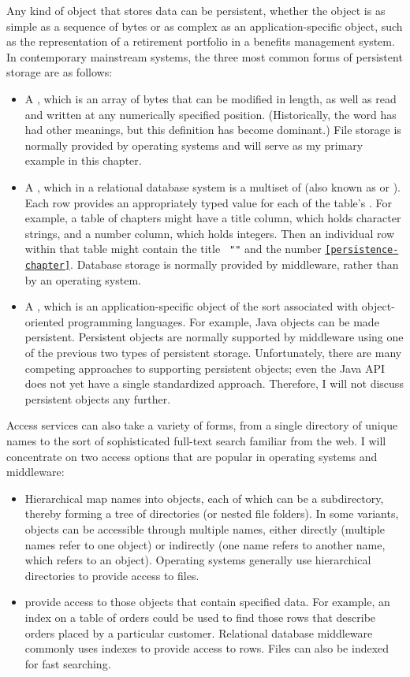 Any kind of object that stores data can be persistent,
whether the object is as simple as a
sequence of bytes or as complex as an application-specific object,
such as the representation of a retirement portfolio in a benefits
management system.  In contemporary mainstream systems, the three most
common forms of persistent storage are as follows:
\begin{itemize}
\item
A , which is an array of bytes that can be modified in length, as
well as read and written at any numerically specified position.
(Historically, the word has had other meanings, but this definition
has become dominant.)  File storage is normally provided by operating
systems and will serve as my primary example in this chapter.
\item
A , which in a relational database system is a multiset of
 (also known as  or ). Each row provides an
appropriately typed value for each of the table's .
For example, a table of chapters might have a title column, which holds
character strings, and a number column, which holds integers.  Then an
individual row within that table might contain the title {\tt
"\persistenceChapterTitle"} and the number {\tt \ref{persistence-chapter}}.
Database storage is normally provided by middleware, rather than by an
operating system.
\item
A , which is
an application-specific object of the sort associated with
object-oriented programming languages.  For example, Java objects
can be made persistent.  Persistent objects
are normally supported by middleware using one of the previous two
types of persistent storage.  Unfortunately, there are many
competing approaches to supporting persistent objects; even the Java
API does not yet have a single standardized approach.  Therefore, I will not
discuss persistent objects any further.
\end{itemize}

Access services can also take a variety of forms, from a single
directory of unique names to the sort of sophisticated full-text
search familiar from the web.  I will concentrate on two access options
that are popular in operating systems and middleware:
\begin{itemize}
\item
Hierarchical  map names into objects, each of
which can be a subdirectory, thereby forming a tree of directories (or
nested file folders). In some variants, objects can be accessible
through multiple names, either directly (multiple names refer to one
object) or indirectly (one name refers to another name, which refers
to an object).  Operating systems generally use hierarchical
directories to provide access to files.
\item
{} provide access to those objects that contain specified data.
For example, an index on a table of orders could be used to find those rows
that describe orders placed by a particular customer.  Relational database
middleware commonly uses indexes to provide access to rows.   Files
can also be indexed for fast searching.
\end{itemize}

